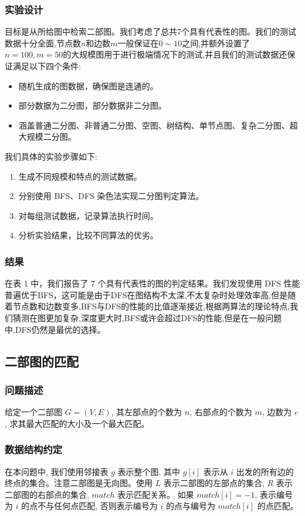 \subsubsection{\textbf{\mbox{实验设计}}}
目标是从所给图中检索二部图。我们考虑了总共7个具有代表性的图。我们的测试数据十分全面,节点数$n$和边数$m$一般保证在$0\sim10$之间,并额外设置了$n=100,m=50$的大规模图用于进行极端情况下的测试,并且我们的测试数据还保证满足以下四个条件:
\begin{itemize}
	\item 随机生成的图数据，确保图是连通的。
	\item 部分数据为二分图，部分数据非二分图。
	\item 涵盖普通二分图、非普通二分图、空图、树结构、单节点图、复杂二分图、超大规模二分图。
\end{itemize}
我们具体的实验步骤如下:
\begin{enumerate}
	\item 生成不同规模和特点的测试数据。
	\item 分别使用 BFS、DFS 染色法实现二分图判定算法。
	\item 对每组测试数据，记录算法执行时间。
	\item 分析实验结果，比较不同算法的优劣。
\end{enumerate}

\subsubsection{\textbf{\mbox{结果}}}
在表 1 中，我们报告了 7 个具有代表性的图的判定结果。我们发现使用 DFS 性能普遍优于BFS，这可能是由于DFS在图结构不太深,不太复杂时处理效率高,但是随着节点数和边数变多,BFS与DFS的性能的比值逐渐接近,根据两算法的理论特点,我们猜测在图更加复杂,深度更大时,BFS或许会超过DFS的性能,但是在一般问题中,DFS仍然是最优的选择。

\subsection{\textbf{\mbox{二部图的匹配}}}
\subsubsection{问题描述}
给定一个二部图 $G = \left(V, E\right)$, 其左部点的个数为 $n$, 右部点的个数为 $m$, 边数为 $e$, 求其最大匹配的大小及一个最大匹配。
\subsubsection{数据结构约定}
在本问题中, 我们使用邻接表 $g$ 表示整个图, 其中 $g[i]$ 表示从 $i$ 出发的所有边的终点的集合。注意二部图是无向图。使用 $L$ 表示二部图的左部点的集合, $R$ 表示二部图的右部点的集合, $match$ 表示匹配关系。
如果 $match[i] = -1$, 表示编号为 $i$ 的点不与任何点匹配, 否则表示编号为 $i$ 的点与编号为 $match[i]$ 的点匹配。

